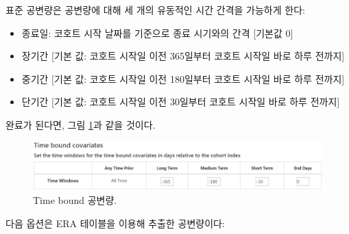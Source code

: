 \documentclass[10.5pt]{book}
\providecommand{\tightlist}{%
  \setlength{\itemsep}{0pt}\setlength{\parskip}{0pt}}
\theoremstyle{definition}
\theoremstyle{definition}
\theoremstyle{definition}
\theoremstyle{remark}
\begin{document}
표준 공변량은 공변량에 대해 세 개의 유동적인 시간 간격을 가능하게 한다:

\begin{itemize}
\tightlist
\item
  종료일: 코호트 시작 날짜를 기준으로 종료 시기와의 간격 {[}기본값 0{]}
\item
  장기간 {[}기본 값: 코호트 시작일 이전 365일부터 코호트 시작일 바로
  하루 전까지{]}
\item
  중기간 {[}기본 값: 코호트 시작일 이전 180일부터 코호트 시작일 바로
  하루 전까지{]}
\item
  단기간 {[}기본 값: 코호트 시작일 이전 30일부터 코호트 시작일 바로 하루
  전까지{]}
\end{itemize}

완료가 된다면, 그림 \ref{fig:covariateSettings3}과 같을 것이다.

\begin{figure}

{\centering \includegraphics[width=1\linewidth]{images/PatientLevelPrediction/covariateSettings3} 

}

\caption{Time bound 공변량.}\label{fig:covariateSettings3}
\end{figure}

다음 옵션은 ERA 테이블을 이용해 추출한 공변량이다:
\end{document}
